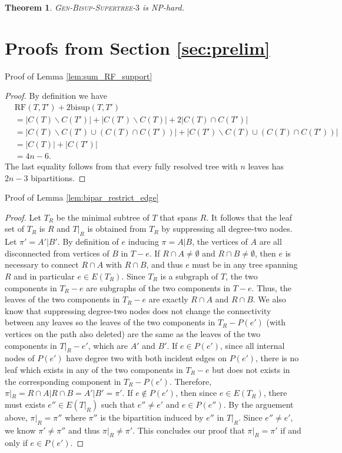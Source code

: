 \documentclass{bmcart}
\newcommand{\bs}{\mathrm{bisup}}
\newcommand{\RF}{\mathrm{RF}}
\newcommand{\genbisupthree}{\textsc{Gen-Bisup-Supertree-$3$}\xspace}
\newtheorem{theorem}{Theorem}
\begin{document}
\begin{theorem}\label{thm:hardness}
\genbisupthree is NP-hard.
\end{theorem}


\appendix
\section{Proofs from Section \ref{sec:prelim}}

Proof of Lemma \ref{lem:sum_RF_support}
\begin{proof}
By definition we have 
  \begin{align*}
    &\RF(T,T')+2\bs(T,T') \\ &= |C(T)\backslash C(T')| + |C(T') \backslash C(T)| + 2|C(T) \cap C(T')| \\
    &= |C(T)\backslash C(T') \cup (C(T) \cap C(T'))| + |C(T') \backslash C(T) \cup (C(T) \cap C(T'))|\\
    &= |C(T)| + |C(T')|\\
    &= 4n-6.
  \end{align*}
  The last equality follows from that every fully resolved tree with $n$ leaves has $2n-3$ bipartitions.
\end{proof}

Proof of Lemma \ref{lem:bipar_restrict_edge}
\begin{proof}
Let $T_R$ be the minimal subtree of $T$ that spans $R$. It follows that the leaf set of $T_R$ is $R$ and $T|_R$ is obtained from $T_R$ by suppressing all degree-two nodes. Let $\pi' = A'|B'$.
By definition of $e$ inducing $\pi = A|B$, the vertices of $A$ are all disconnected from vertices of $B$ in $T-e$. If $R\cap A \neq \emptyset$ and $R\cap B \neq \emptyset$, then $e$ is necessary to connect $R\cap A$ with $R \cap B$, and thus $e$ must be in any tree spanning $R$ and in particular $e \in E(T_R)$. Since $T_R$ is a subgraph of $T$, the two components in $T_R-e$ are subgraphs of the two components in $T-e$. Thus, the leaves of the two components in $T_R-e$ are exactly $R\cap A$ and $R\cap B$. We also know that suppressing degree-two nodes does not change the connectivity between any leaves so the leaves of the two components in $T_R - P(e')$ (with vertices on the path also deleted) are the same as the leaves of the two components in $T|_R - e'$, which are $A'$ and $B'$. If $e \in P(e')$, since all internal nodes of $P(e')$ have degree two with both incident edges on $P(e')$, there is no leaf which exists in any of the two components in $T_R - e$ but does not exists in the corresponding component in $T_R-P(e')$. Therefore, $\pi|_R = R\cap A|R\cap B = A'|B' = \pi'$. If $e \notin P(e')$, then since $e \in E(T_R)$, there must exists $e'' \in E(T|_R)$ such that $e'' \neq e'$ and $e \in P(e'')$. By the arguement above, $\pi|_R = \pi''$ where $\pi''$ is the bipartition induced by $e''$ in $T|_R$. Since $e'' \neq e'$, we know $\pi' \neq \pi''$ and thus $\pi|_R \neq \pi'$. This concludes our proof that $\pi|_R = \pi'$ if and only if $e \in P(e')$. 
\end{proof}
\end{document}
